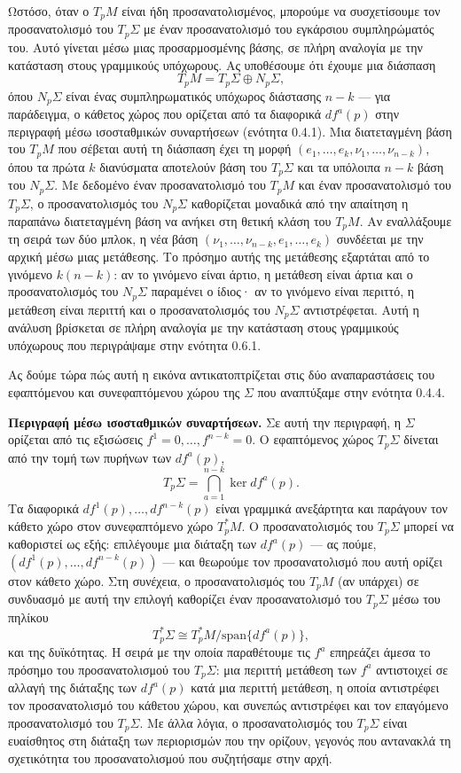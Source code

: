 \documentclass[11pt,a4paper,twoside,openright]{book}
\begin{document}
Ωστόσο, όταν ο $T_pM$ είναι ήδη προσανατολισμένος, μπορούμε να συσχετίσουμε τον προσανατολισμό του $T_p\Sigma$ με έναν προσανατολισμό του εγκάρσιου συμπληρώματός του. Αυτό γίνεται μέσω μιας προσαρμοσμένης βάσης, σε πλήρη αναλογία με την κατάσταση στους γραμμικούς υπόχωρους. Ας υποθέσουμε ότι έχουμε μια διάσπαση
\[
T_pM = T_p\Sigma \oplus N_p\Sigma,
\]
όπου $N_p\Sigma$ είναι ένας συμπληρωματικός υπόχωρος διάστασης $n-k$ --- για παράδειγμα, ο κάθετος χώρος που ορίζεται από τα διαφορικά $df^a(p)$ στην περιγραφή μέσω ισοσταθμικών συναρτήσεων (ενότητα 0.4.1). Μια διατεταγμένη βάση του $T_pM$ που σέβεται αυτή τη διάσπαση έχει τη μορφή $(e_1, \dots, e_k, \nu_1, \dots, \nu_{n-k})$, όπου τα πρώτα $k$ διανύσματα αποτελούν βάση του $T_p\Sigma$ και τα υπόλοιπα $n-k$ βάση του $N_p\Sigma$. Με δεδομένο έναν προσανατολισμό του $T_pM$ και έναν προσανατολισμό του $T_p\Sigma$, ο προσανατολισμός του $N_p\Sigma$ καθορίζεται μοναδικά από την απαίτηση η παραπάνω διατεταγμένη βάση να ανήκει στη θετική κλάση του $T_pM$. Αν εναλλάξουμε τη σειρά των δύο μπλοκ, η νέα βάση $(\nu_1, \dots, \nu_{n-k}, e_1, \dots, e_k)$ συνδέεται με την αρχική μέσω μιας μετάθεσης. Το πρόσημο αυτής της μετάθεσης εξαρτάται από το γινόμενο $k(n-k)$: αν το γινόμενο είναι άρτιο, η μετάθεση είναι άρτια και ο προσανατολισμός του $N_p\Sigma$ παραμένει ο ίδιος· αν το γινόμενο είναι περιττό, η μετάθεση είναι περιττή και ο προσανατολισμός του $N_p\Sigma$ αντιστρέφεται. Αυτή η ανάλυση βρίσκεται σε πλήρη αναλογία με την κατάσταση στους γραμμικούς υπόχωρους που περιγράψαμε στην ενότητα 0.6.1.

Ας δούμε τώρα πώς αυτή η εικόνα αντικατοπτρίζεται στις δύο αναπαραστάσεις του εφαπτόμενου και συνεφαπτόμενου χώρου της $\Sigma$ που αναπτύξαμε στην ενότητα 0.4.4.

\textbf{Περιγραφή μέσω ισοσταθμικών συναρτήσεων.} Σε αυτή την περιγραφή, η $\Sigma$ ορίζεται από τις εξισώσεις $f^1 = 0, \dots, f^{n-k} = 0$. Ο εφαπτόμενος χώρος $T_p\Sigma$ δίνεται από την τομή των πυρήνων των $df^a(p)$,
\[
T_p\Sigma = \bigcap_{a=1}^{n-k} \ker df^a(p).
\]
Τα διαφορικά $df^1(p), \dots, df^{n-k}(p)$ είναι γραμμικά ανεξάρτητα και παράγουν τον κάθετο χώρο στον συνεφαπτόμενο χώρο $T_p^*M$. Ο προσανατολισμός του $T_p\Sigma$ μπορεί να καθοριστεί ως εξής: επιλέγουμε μια διάταξη των $df^a(p)$ --- ας πούμε, $(df^1(p), \dots, df^{n-k}(p))$ --- και θεωρούμε τον προσανατολισμό που αυτή ορίζει στον κάθετο χώρο. Στη συνέχεια, ο προσανατολισμός του $T_pM$ (αν υπάρχει) σε συνδυασμό με αυτή την επιλογή καθορίζει έναν προσανατολισμό του $T_p\Sigma$ μέσω του πηλίκου
\[
T_p^*\Sigma \cong T_p^*M / \text{span}\{df^a(p)\},
\]
και της δυϊκότητας. Η σειρά με την οποία παραθέτουμε τις $f^a$ επηρεάζει άμεσα το πρόσημο του προσανατολισμού του $T_p\Sigma$: μια περιττή μετάθεση των $f^a$ αντιστοιχεί σε αλλαγή της διάταξης των $df^a(p)$ κατά μια περιττή μετάθεση, η οποία αντιστρέφει τον προσανατολισμό του κάθετου χώρου, και συνεπώς αντιστρέφει και τον επαγόμενο προσανατολισμό του $T_p\Sigma$. Με άλλα λόγια, ο προσανατολισμός του $T_p\Sigma$ είναι ευαίσθητος στη διάταξη των περιορισμών που την ορίζουν, γεγονός που αντανακλά τη σχετικότητα του προσανατολισμού που συζητήσαμε στην αρχή.
\end{document}
